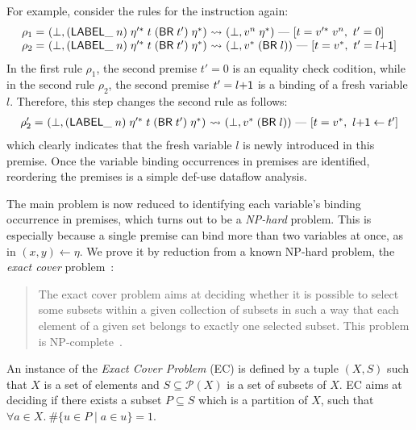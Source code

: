 For example, consider the rules for the  instruction again:
\[
\begin{array}{l@{~}l@{~}c@{~}l}
\rho_1 = &(\bot, (\ssf{LABEL\_} \; n) \; \eta'^*\; t\; (\ssf{BR}\; t')\; \eta^*) &\leadsto&
 (\bot, v^n\; \eta^*)\ \mbox{---}\ [t = v'^*\; v^n,\ t' = 0]\\
\rho_2 = &(\bot, (\ssf{LABEL\_} \; n) \; \eta'^*\; t\; (\ssf{BR}\; t')\; \eta^*) &\leadsto&
 (\bot, v^*\; (\ssf{BR}\; l))\ \mbox{---}\ [t = v^*,\ t' = l\ssf{+1}]
\end{array}
\]
In the first rule $\rho_1$, the second premise $t' = 0$ is an equality check codition,
while in the second rule $\rho_2$, the second premise $t' = l\mathsf{+1}$ is a binding of a fresh variable $l$.
Therefore, this step changes the second rule as follows:
\[
\begin{array}{l@{~}l@{~}c@{~}l}
\rho_2' = &(\bot, (\ssf{LABEL\_} \; n) \; \eta'^*\; t\; (\ssf{BR}\; t')\; \eta^*) &\leadsto&
 (\bot, v^*\; (\ssf{BR}\; l))\ \mbox{---}\ [t = v^*,\ l\ssf{+1} \leftarrow t']
\end{array}
 \]
which clearly indicates that the fresh variable $l$ is newly introduced in this premise.
Once the variable binding occurrences in premises are identified,
reordering the premises is a simple def-use dataflow analysis.

The main problem is now reduced to identifying each variable's binding occurrence in premises,
which turns out to be a \textit{NP-hard} problem.
This is especially because a single premise can bind more than two variables at once,
as in $(x,y) \leftarrow \eta$.
We prove it by reduction from a known NP-hard problem, the \textit{exact cover} problem~\cite{exactcover}:
\begin{quote}
The exact cover problem aims at deciding whether it is possible to select some subsets within a given collection of subsets in such a way that each element of a given set belongs to exactly one selected subset. This problem is NP-complete~\cite{karp72}.
\end{quote}

\begin{definition}\label{def:exactcover}
An instance of the \textit{Exact Cover Problem} (EC) is defined by a tuple $(X, S)$
such that $X$ is a set of elements and $S \subseteq \mathcal{P}(X)$ is a set of subsets of $X$.
EC aims at deciding if there exists a subset $P \subseteq S$ which is a partition of $X$,
such that $\forall a \in X.\ \#\{ u \in P \mid a \in u \} = 1$.
\end{definition}

